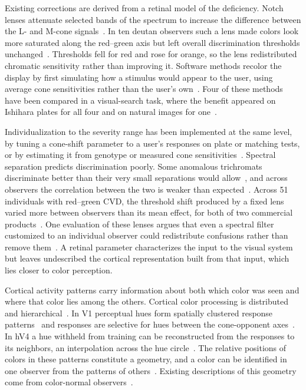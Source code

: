 Existing corrections are derived from a retinal model of the deficiency. Notch lenses attenuate selected bands of the spectrum to increase the difference between the L- and M-cone signals~\citep{alvaro2022, gomezrobledo2018}. In ten deutan observers such a lens made colors look more saturated along the red--green axis but left overall discrimination thresholds unchanged~\citep{somers2024}. Thresholds fell for red and rose for orange, so the lens redistributed chromatic sensitivity rather than improving it. Software methods recolor the display by first simulating how a stimulus would appear to the user, using average cone sensitivities rather than the user's own~\citep{brettel1997, machado2009, fidaner2005}. Four of these methods have been compared in a visual-search task, where the benefit appeared on Ishihara plates for all four and on natural images for one~\citep{simonliedtke2016}.

Individualization to the severity range has been implemented at the same level, by tuning a cone-shift parameter to a user's responses on plate or matching tests, or by estimating it from genotype or measured cone sensitivities~\citep{deeb2005, stockman2000}. Spectral separation predicts discrimination poorly. Some anomalous trichromats discriminate better than their very small separations would allow~\citep{neitz2011}, and across observers the correlation between the two is weaker than expected~\citep{bosten2019}. Across 51 individuals with red--green CVD, the threshold shift produced by a fixed lens varied more between observers than its mean effect, for both of two commercial products~\citep{patterson2022}. One evaluation of these lenses argues that even a spectral filter customized to an individual observer could redistribute confusions rather than remove them~\citep{gomezrobledo2018}. A retinal parameter characterizes the input to the visual system but leaves undescribed the cortical representation built from that input, which lies closer to color perception.

Cortical activity patterns carry information about both which color was seen and where that color lies among the others. Cortical color processing is distributed and hierarchical~\citep{gegenfurtner2003, shapley2011, conway2018}. In V1 perceptual hues form spatially clustered response patterns~\citep{parkes2009} and responses are selective for hues between the cone-opponent axes~\citep{kuriki2015}. In hV4 a hue withheld from training can be reconstructed from the responses to its neighbors, an interpolation across the hue circle~\citep{brouwer2009}. The relative positions of colors in these patterns constitute a geometry, and a color can be identified in one observer from the patterns of others~\citep{bannert2025}. Existing descriptions of this geometry come from color-normal observers~\citep{brouwer2009, brouwer2013, kuriki2015}.

